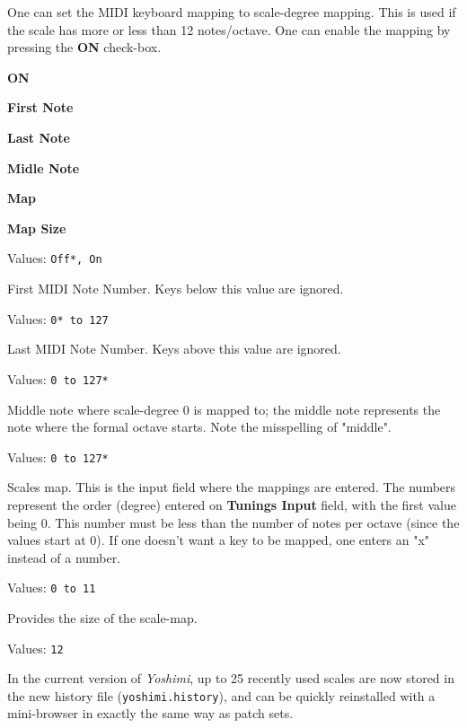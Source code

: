    One can set the MIDI keyboard mapping to scale-degree mapping.
   This is used if the scale has more or less than 12 notes/octave.
   One can enable the mapping by pressing the \textbf{ON} check-box.

   \begin{enumber}
      \item \textbf{ON}
      \item \textbf{First Note}
      \item \textbf{Last Note}
      \item \textbf{Midle Note}
      \item \textbf{Map}
      \item \textbf{Map Size}
   \end{enumber}

   \setcounter{ItemCounter}{0}      %


   Values: \texttt{Off*, On}

   First MIDI Note Number.
   Keys below this value are ignored.

   Values: \texttt{0* to 127}

   Last MIDI Note Number.
   Keys above this value are ignored.

   Values: \texttt{0 to 127*}

   Middle note where scale-degree 0 is mapped to;
   the middle note represents the note where the formal octave starts.
   Note the misspelling of "middle".

   Values: \texttt{0 to 127*}

   Scales map.  This is the input field where the mappings are entered.
   The numbers represent the order (degree) entered on
   \textbf{Tunings Input} field, with the first value being 0.
   This number must be less than the number of notes per octave (since
   the values start at 0).
   If one doesn't want a key to be mapped, one enters an "x" instead of a
   number.

   Values: \texttt{0 to 11}

   Provides the size of the scale-map.

   Values: \texttt{12}

   In the current version of \textsl{Yoshimi}, up to 25 recently used scales are
   now stored in the new history file
   (\texttt{yoshimi.history}), and can be quickly reinstalled with a
   mini-browser in exactly the same way as patch sets.

